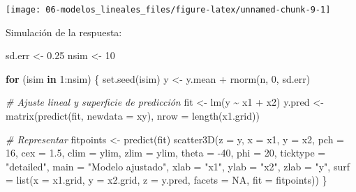 \documentclass[
]{book}
\newenvironment{Shaded}{\begin{snugshade}}{\end{snugshade}}
\newcommand{\AttributeTok}[1]{\textcolor[rgb]{0.77,0.63,0.00}{#1}}
\newcommand{\CommentTok}[1]{\textcolor[rgb]{0.56,0.35,0.01}{\textit{#1}}}
\newcommand{\ConstantTok}[1]{\textcolor[rgb]{0.00,0.00,0.00}{#1}}
\newcommand{\ControlFlowTok}[1]{\textcolor[rgb]{0.13,0.29,0.53}{\textbf{#1}}}
\newcommand{\DecValTok}[1]{\textcolor[rgb]{0.00,0.00,0.81}{#1}}
\newcommand{\FloatTok}[1]{\textcolor[rgb]{0.00,0.00,0.81}{#1}}
\newcommand{\FunctionTok}[1]{\textcolor[rgb]{0.00,0.00,0.00}{#1}}
\newcommand{\NormalTok}[1]{#1}
\newcommand{\OtherTok}[1]{\textcolor[rgb]{0.56,0.35,0.01}{#1}}
\newcommand{\SpecialCharTok}[1]{\textcolor[rgb]{0.00,0.00,0.00}{#1}}
\newcommand{\StringTok}[1]{\textcolor[rgb]{0.31,0.60,0.02}{#1}}
\theoremstyle{break}
\theoremstyle{definition}
\theoremstyle{definition}
\theoremstyle{definition}
\theoremstyle{definition}
\theoremstyle{remark}
\begin{document}
\begin{center}\texttt{[image: 06-modelos\_lineales\_files/figure-latex/unnamed-chunk-9-1]} \end{center}

Simulación de la respuesta:

\begin{Shaded}
\begin{Highlighting}[]
\NormalTok{sd.err }\OtherTok{\textless{}{-}} \FloatTok{0.25}
\NormalTok{nsim }\OtherTok{\textless{}{-}} \DecValTok{10}

\ControlFlowTok{for}\NormalTok{ (isim }\ControlFlowTok{in} \DecValTok{1}\SpecialCharTok{:}\NormalTok{nsim) \{}
  \FunctionTok{set.seed}\NormalTok{(isim)}
\NormalTok{  y }\OtherTok{\textless{}{-}}\NormalTok{ y.mean }\SpecialCharTok{+} \FunctionTok{rnorm}\NormalTok{(n, }\DecValTok{0}\NormalTok{, sd.err)}
  
  \CommentTok{\# Ajuste lineal y superficie de predicción}
\NormalTok{  fit }\OtherTok{\textless{}{-}} \FunctionTok{lm}\NormalTok{(y }\SpecialCharTok{\textasciitilde{}}\NormalTok{ x1 }\SpecialCharTok{+}\NormalTok{ x2)}
\NormalTok{  y.pred }\OtherTok{\textless{}{-}} \FunctionTok{matrix}\NormalTok{(}\FunctionTok{predict}\NormalTok{(fit, }\AttributeTok{newdata =}\NormalTok{ xy), }\AttributeTok{nrow =} \FunctionTok{length}\NormalTok{(x1.grid)) }
  
  \CommentTok{\# Representar}
\NormalTok{  fitpoints }\OtherTok{\textless{}{-}} \FunctionTok{predict}\NormalTok{(fit) }
  \FunctionTok{scatter3D}\NormalTok{(}\AttributeTok{z =}\NormalTok{ y, }\AttributeTok{x =}\NormalTok{ x1, }\AttributeTok{y =}\NormalTok{ x2, }\AttributeTok{pch =} \DecValTok{16}\NormalTok{, }\AttributeTok{cex =} \FloatTok{1.5}\NormalTok{, }\AttributeTok{clim =}\NormalTok{ ylim, }\AttributeTok{zlim =}\NormalTok{ ylim,}
            \AttributeTok{theta =} \SpecialCharTok{{-}}\DecValTok{40}\NormalTok{, }\AttributeTok{phi =} \DecValTok{20}\NormalTok{, }\AttributeTok{ticktype =} \StringTok{"detailed"}\NormalTok{, }
            \AttributeTok{main =} \StringTok{"Modelo ajustado"}\NormalTok{, }\AttributeTok{xlab =} \StringTok{"x1"}\NormalTok{, }\AttributeTok{ylab =} \StringTok{"x2"}\NormalTok{, }\AttributeTok{zlab =} \StringTok{"y"}\NormalTok{, }
            \AttributeTok{surf =} \FunctionTok{list}\NormalTok{(}\AttributeTok{x =}\NormalTok{ x1.grid, }\AttributeTok{y =}\NormalTok{ x2.grid, }\AttributeTok{z =}\NormalTok{ y.pred, }
                        \AttributeTok{facets =} \ConstantTok{NA}\NormalTok{, }\AttributeTok{fit =}\NormalTok{ fitpoints))}
\NormalTok{\}}
\end{Highlighting}
\end{Shaded}
\end{document}
